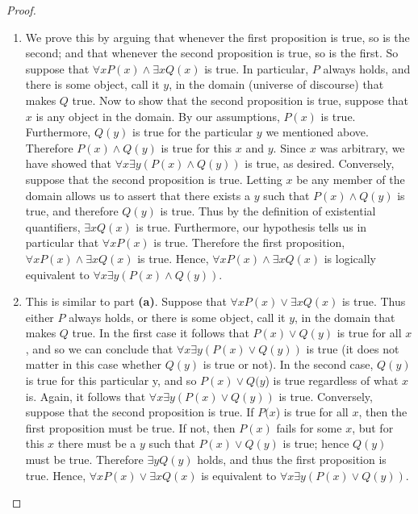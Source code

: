 \documentclass{article}
\begin{document}
\begin{proof}
\hspace{1pt}

\begin{enumerate}[leftmargin=16pt, topsep = 8pt]
\item We prove this by arguing that whenever the first proposition is true, so is the second; and that whenever the second proposition is true, so is the first. So suppose that $\forall xP(x) \land \exists xQ(x)$ is true. In particular, $P$ always holds, and there is some object, call it $y$, in the domain (universe of discourse) that makes $Q$ true. Now to show that the second proposition is true, suppose that $x$ is any object in the domain. By our assumptions, $P(x)$ is true. Furthermore, $Q(y)$ is true for the particular $y$ we mentioned above. Therefore $P(x) \land Q(y)$ is true for this $x$ and $y$. Since $x$ was arbitrary, we have showed that $\forall x \exists y(P(x) \land Q(y))$ is true, as desired. Conversely, suppose that the second proposition is true. Letting $x$ be any member of the domain allows us to assert that there exists a $y$ such that $P(x) \land Q(y)$ is true, and therefore $Q(y)$ is true. Thus by the definition of existential quantifiers, $\exists xQ(x)$ is true. Furthermore, our hypothesis tells us in particular that $\forall xP(x)$ is true. Therefore the first proposition, $\forall xP(x) \land \exists xQ(x)$ is true. Hence, $\forall xP(x) \land \exists xQ(x)$ is logically equivalent to $\forall x \exists y(P(x) \land Q(y))$.
\item This is similar to part \textbf{(a)}. Suppose that $\forall xP(x) \lor \exists xQ(x)$ is true. Thus either $P$ always holds, or there is some object, call it $y$, in the domain that makes $Q$ true. In the first case it follows that $P(x) \lor Q(y)$ is true for all $x$, and so we can conclude that $\forall x \exists y(P(x) \lor Q(y))$ is true (it does not matter in this case whether $Q(y)$ is true or not). In the second case, $Q(y)$ is true for this particular y, and so $P(x) \lor Q(y$) is true regardless of what $x$ is. Again, it follows that $\forall x \exists y(P(x) \lor Q(y))$ is true. Conversely, suppose that the second proposition is true. If $P(x$) is true for all $x$, then the first proposition must be true. If not, then $P(x)$ fails for some $x$, but for this $x$ there must be a $y$ such that $P(x) \lor Q(y)$ is true; hence $Q(y)$ must be true. Therefore $\exists yQ(y)$ holds, and thus the first proposition is true. Hence, $\forall xP(x) \lor \exists xQ(x)$ is equivalent to $\forall x \exists y(P(x) \lor Q(y))$.
\end{enumerate}
\end{proof}
\end{document}
